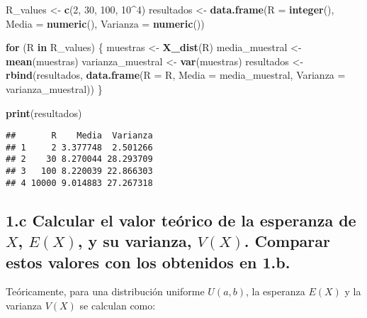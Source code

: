 \documentclass[
]{article}
\newenvironment{Shaded}{\begin{snugshade}}{\end{snugshade}}
\newcommand{\AttributeTok}[1]{\textcolor[rgb]{0.13,0.29,0.53}{#1}}
\newcommand{\ControlFlowTok}[1]{\textcolor[rgb]{0.13,0.29,0.53}{\textbf{#1}}}
\newcommand{\DecValTok}[1]{\textcolor[rgb]{0.00,0.00,0.81}{#1}}
\newcommand{\FunctionTok}[1]{\textcolor[rgb]{0.13,0.29,0.53}{\textbf{#1}}}
\newcommand{\NormalTok}[1]{#1}
\newcommand{\OtherTok}[1]{\textcolor[rgb]{0.56,0.35,0.01}{#1}}
\newcommand{\SpecialCharTok}[1]{\textcolor[rgb]{0.81,0.36,0.00}{\textbf{#1}}}
\begin{document}
\begin{Shaded}
\begin{Highlighting}[]
\NormalTok{R\_values }\OtherTok{\textless{}{-}} \FunctionTok{c}\NormalTok{(}\DecValTok{2}\NormalTok{, }\DecValTok{30}\NormalTok{, }\DecValTok{100}\NormalTok{, }\DecValTok{10}\SpecialCharTok{\^{}}\DecValTok{4}\NormalTok{)}
\NormalTok{resultados }\OtherTok{\textless{}{-}} \FunctionTok{data.frame}\NormalTok{(}\AttributeTok{R =} \FunctionTok{integer}\NormalTok{(), }\AttributeTok{Media =} \FunctionTok{numeric}\NormalTok{(), }\AttributeTok{Varianza =} \FunctionTok{numeric}\NormalTok{())}

\ControlFlowTok{for}\NormalTok{ (R }\ControlFlowTok{in}\NormalTok{ R\_values) \{}
\NormalTok{  muestras }\OtherTok{\textless{}{-}} \FunctionTok{X\_dist}\NormalTok{(R)}
\NormalTok{  media\_muestral }\OtherTok{\textless{}{-}} \FunctionTok{mean}\NormalTok{(muestras)}
\NormalTok{  varianza\_muestral }\OtherTok{\textless{}{-}} \FunctionTok{var}\NormalTok{(muestras)}
\NormalTok{  resultados }\OtherTok{\textless{}{-}} \FunctionTok{rbind}\NormalTok{(resultados, }\FunctionTok{data.frame}\NormalTok{(}\AttributeTok{R =}\NormalTok{ R, }\AttributeTok{Media =}\NormalTok{ media\_muestral, }\AttributeTok{Varianza =}\NormalTok{ varianza\_muestral))}
\NormalTok{\}}

\FunctionTok{print}\NormalTok{(resultados)}
\end{Highlighting}
\end{Shaded}

\begin{verbatim}
##       R    Media  Varianza
## 1     2 3.377748  2.501266
## 2    30 8.270044 28.293709
## 3   100 8.220039 22.866303
## 4 10000 9.014883 27.267318
\end{verbatim}

\subsection{\texorpdfstring{1.c Calcular el valor teórico de la
esperanza de \(X\), \(E(X)\), y su varianza, \(V(X)\). Comparar estos
valores con los obtenidos en
1.b.}{1.c Calcular el valor teórico de la esperanza de X, E(X), y su varianza, V(X). Comparar estos valores con los obtenidos en 1.b.}}\label{c-calcular-el-valor-teuxf3rico-de-la-esperanza-de-x-ex-y-su-varianza-vx.-comparar-estos-valores-con-los-obtenidos-en-1.b.}

Teóricamente, para una distribución uniforme \(U(a, b)\), la esperanza
\(E(X)\) y la varianza \(V(X)\) se calculan como:
\end{document}

